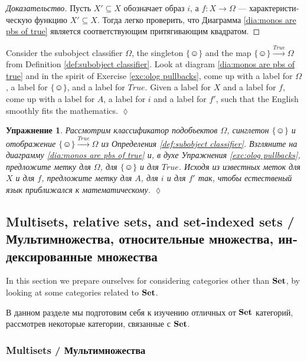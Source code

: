 \documentclass[a4paper]{book}
\def\singleton{\{\smiley\}}
\def\to{\rightarrow}
\def\taking{\colon}
\def\ss{\subseteq}
\newcommand{\To}[1]{\xrightarrow{#1}}
\def\Set{{\bf Set}}
\theoremstyle{myth}
\newtheorem{excENG}[envENG]{\begin{english}Exercise\end{english}}
\newenvironment{exerciseENG}{\begin{excENG}}{\hspace*{\fill}$\lozenge$\end{excENG}}
\newtheorem{excRUS}[envRUS]{Упражнение}
\newenvironment{proofRUS}{\begin{proof}[Доказательство]}{\end{proof}}
\newenvironment{exerciseRUS}{\begin{excRUS}}{\hspace*{\fill}$\lozenge$\end{excRUS}}
\begin{document}
\begin{russian}
\begin{proofRUS}
Пусть $X'\ss X$ обозначает образ $i$, а $f\taking X\to\Omega$ — характеристическую функцию $X'\ss X$. Тогда легко проверить, что Диаграмма \ref{dia:monos are pbs of true} является соответствующим притягивающим квадратом.
\end{proofRUS}

\begin{exerciseENG}
Consider the subobject classifier $\Omega$, the singleton $\singleton$ and the map $\singleton\To{True}\Omega$ from Definition \ref{def:subobject classifier}. Look at diagram \ref{dia:monos are pbs of true} and in the spirit of Exercise \ref{exc:olog pullbacks}, come up with a label for $\Omega$, a label for $\singleton$, and a label for $True$. Given a label for $X$ and a label for $f$, come up with a label for $A$, a label for $i$ and a label for $f'$, such that the English smoothly fits the mathematics.
\end{exerciseENG}

\begin{exerciseRUS}
Рассмотрим классификатор подобъектов $\Omega$, синглетон $\singleton$ и отображение $\singleton\To{True}\Omega$ из Определения \ref{def:subobject classifier}. Взгляните на диаграмму \ref{dia:monos are pbs of true} и, в духе Упражнения \ref{exc:olog pullbacks}, предложите метку для $\Omega$, для $\singleton$ и для $True$. Исходя из известных меток для $X$ и для $f$, предложите метку для $A$, для $i$ и для $f'$ так, чтобы естественый язык приближался к математическому.%
\end{exerciseRUS}


\subsection{Multisets, relative sets, and set-indexed sets / Мультимножества, относительные множества, индексированные множества}

In this section we prepare ourselves for considering categories other than $\Set$, by looking at some categories related to $\Set$. 

В данном разделе мы подготовим себя к изучению отличных от $\Set$ категорий, рассмотрев некоторые категории, связанные с $\Set$. 


\subsubsection{Multisets / Мультимножества}


\end{russian}
\end{document}
